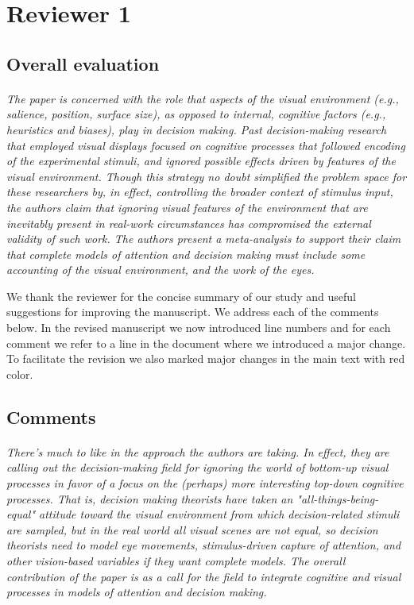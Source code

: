 \documentclass[english,natbib,man,floatsintext]{apa6}
\newcommand\eatpunct[1]{}
\newcommand{\com}[2][]{\vspace{5mm}\paragraph[ ]{ \eatpunct}\label{#1}\emph{#2}\vspace{5mm}}
\begin{document}

\section{Reviewer 1}
\label{rev:r1}

\subsection{Overall evaluation}
\label{rev:r1sum}

\com[com-r1-eval]{The paper is concerned with the role that aspects of the visual environment (e.g., salience, position, surface size), as opposed to internal, cognitive factors (e.g., heuristics and biases), play in decision making. Past decision-making research that employed visual displays focused on cognitive processes that followed encoding of the experimental stimuli, and ignored possible effects driven by features of the visual environment. Though this strategy no doubt simplified the problem space for these researchers by, in effect, controlling the broader context of stimulus input, the authors claim that ignoring visual features of the environment that are inevitably present in real-work circumstances has compromised the external validity of such work. The authors present a meta-analysis to support their claim that complete models of attention and decision making must include some accounting of the visual environment, and the work of the eyes.} 

We thank the reviewer for the concise summary of our study and useful suggestions for improving the manuscript. We address each of the comments below. In the revised manuscript we now introduced line numbers and for each comment we refer to a line in the document where we introduced a major change. To facilitate the revision we also marked major changes in the main text with red color.


\subsection{Comments}

\com[com-r1-XX]{There's much to like in the approach the authors are taking. In effect, they are calling out the decision-making field for ignoring the world of bottom-up visual processes in favor of a focus on the (perhaps) more interesting top-down cognitive processes. That is, decision making theorists have taken an "all-things-being-equal" attitude toward the visual environment from which decision-related stimuli are sampled, but in the real world all visual scenes are not equal, so decision theorists need to model eye movements, stimulus-driven capture of attention, and other vision-based variables if they want complete models. The overall contribution of the paper is as a call for the field to integrate cognitive and visual processes in models of attention and decision making.}
\end{document}
